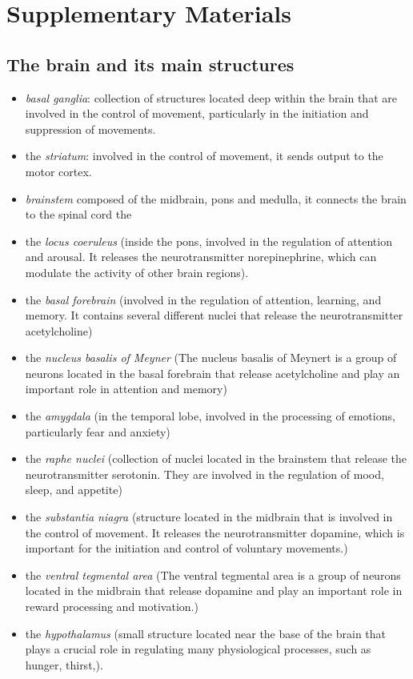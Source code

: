 \chapter{Supplementary Materials}
\section{The brain and its main structures}
\begin{itemize}
 \item \textit{basal ganglia}: collection of structures located deep within the brain that are involved in the control of movement, particularly in the initiation and suppression of movements.
 \item the \textit{striatum}: involved in the control of movement, it sends output to the motor cortex. 
 \item  \textit{brainstem} composed of the midbrain, pons and medulla, it connects the brain to the spinal cord
 the \item the \textit{locus coeruleus} (inside the pons, involved in the regulation of attention and arousal. It releases the neurotransmitter norepinephrine, which can modulate the activity of other brain regions).
 \item the \textit{basal forebrain} (involved in the regulation of attention, learning, and memory. It contains several different nuclei that release the neurotransmitter acetylcholine)
 \item the \textit{nucleus basalis of Meyner} (The nucleus basalis of Meynert is a group of neurons located in the basal forebrain that release acetylcholine and play an important role in attention and memory)
 \item the \textit{amygdala} (in the temporal lobe, involved in the processing of emotions, particularly fear and anxiety)
 \item the \textit{raphe nuclei} (collection of nuclei located in the brainstem that release the neurotransmitter serotonin. They are involved in the regulation of mood, sleep, and appetite)
 \item the \textit{substantia niagra} (structure located in the midbrain that is involved in the control of movement. It releases the neurotransmitter dopamine, which is important for the initiation and control of voluntary movements.)
 \item the \textit{ventral tegmental area} (The ventral tegmental area is a group of neurons located in the midbrain that release dopamine and play an important role in reward processing and motivation.)
 \item the \textit{hypothalamus} (small structure located near the base of the brain that plays a crucial role in regulating many physiological processes, such as hunger, thirst,).
\end{itemize}



